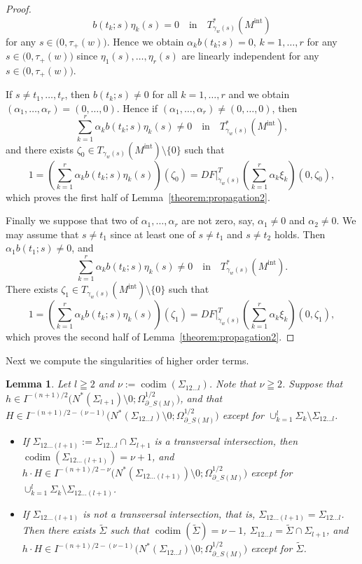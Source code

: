 \documentclass[a4paper,11pt,reqno]{amsart}
\numberwithin{equation}{section}
\newtheorem{lemma}[theorem]{Lemma}
\theoremstyle{definition}
\theoremstyle{remark}
\begin{document}
\begin{proof}
$$b(t_k;s)
\eta_k(s)
=
0
\quad
\text{in}
\quad
T^\ast_{\gamma_w(s)}(M^\text{int})
$$
%
%
for any $s \in \bigl(0,\tau_+(w)\bigr)$. 
Hence we obtain $\alpha_kb(t_k;s)=0$, $k=1,\dotsc,r$ 
for any $s\in\bigl(0,\tau_+(w)\bigr)$ 
since $\eta_1(s),\dotsc,\eta_r(s)$ are linearly independent 
for any $s\in\bigl(0,\tau_+(w)\bigr)$.  
%
%
\par
%
%
If $s \ne t_1,\dotsc,t_r$, then $b(t_k;s)\ne0$ for all $k=1,\dotsc,r$ and we obtain 
$(\alpha_1,\dotsc,\alpha_r)=(0,\dotsc,0)$. 
Hence if $(\alpha_1,\dotsc,\alpha_r)\ne(0,\dotsc,0)$, then 
%
%
$$
\sum_{k=1}^r
\alpha_k
b(t_k;s)
\eta_k(s)
\ne
0
\quad
\text{in}
\quad
T^\ast_{\gamma_w(s)}(M^\text{int}), 
$$
%
%
and there exists $\zeta_0 \in T_{\gamma_w(s)}(M^\text{int})\setminus\{0\}$ such that 
%
%
$$
1
=
\left(
\sum_{k=1}^r
\alpha_k
b(t_k;s)
\eta_k(s)
\right)(\zeta_0)
=
DF\vert^T_{\dot{\gamma}_w(s)}\left(\sum_{k=1}^r\alpha_k\xi_k\right)(0,\zeta_0),
$$
%
%
which proves the first half of Lemma~\ref{theorem:propagation2}. 
%
%
\par
%
%
Finally we suppose that two of $\alpha_1,\dotsc,\alpha_r$ are not zero, say, 
$\alpha_1\ne0$ and $\alpha_2\ne0$. 
We may assume that $s{\ne}t_1$ 
since at least one of $s{\ne}t_1$ and $s{\ne}t_2$ holds. 
Then $\alpha_1b(t_1;s)\ne0$, and 
%
%
$$
\sum_{k=1}^r
\alpha_k
b(t_k;s)
\eta_k(s)
\ne
0
\quad
\text{in}
\quad
T^\ast_{\gamma_w(s)}(M^\text{int}).
$$
%
%
There exists $\zeta_1 \in T_{\gamma_w(s)}(M^\text{int})\setminus\{0\}$ such that 
%
%
$$
1
=
\left(
\sum_{k=1}^r
\alpha_k
b(t_k;s)
\eta_k(s)
\right)(\zeta_1)
=
DF\vert^T_{\dot{\gamma}_w(s)}\left(\sum_{k=1}^r\alpha_k\xi_k\right)(0,\zeta_1),
$$
%
%
which proves the second half of Lemma~\ref{theorem:propagation2}. 
\end{proof}
%
%
Next we compute the singularities of higher order terms. 
%
%
\begin{lemma}
\label{theorem:higherorderterms} 
Let $l\geqq2$ and $\nu:=\operatorname{codim}(\Sigma_{12\dotsc{l}})$. 
Note that $\nu\geqq2$. Suppose that 
$h \in I^{-(n+1)/2}\bigl(N^\ast(\Sigma_{l+1})\setminus0;\Omega_{\partial_-S(M)}^{1/2}\bigr)$, 
and that 
$H \in I^{-(n+1)/2-(\nu-1)}\bigl(N^\ast(\Sigma_{12\dotsc{l}})\setminus0;\Omega_{\partial_-S(M)}^{1/2}\bigr)$ 
except for $\cup_{k=1}^l\Sigma_k\setminus\Sigma_{12\dotsc{l}}$. 
%
%
\begin{itemize}
\item
If  $\Sigma_{12\dotsc(l+1)}:=\Sigma_{12\dotsc{l}}\cap\Sigma_{l+1}$ is a transversal intersection, 
then $\operatorname{codim}(\Sigma_{12\dotsc(l+1)})=\nu+1$, and 
$h{\cdot}H \in  I^{-(n+1)/2-\nu}\bigl(N^\ast(\Sigma_{12\dotsc{(l+1)}})\setminus0;\Omega_{\partial_-S(M)}^{1/2}\bigr)$ 
except for $\cup_{k=1}^l\Sigma_k\setminus\Sigma_{12\dotsc{(l+1)}}$. 
\item
If  $\Sigma_{12\dotsc(l+1)}$ is not a transversal intersection, that is, 
$\Sigma_{12\dotsc(l+1)}=\Sigma_{12\dotsc{l}}$. 
Then there exists $\tilde{\Sigma}$ such that 
$\operatorname{codim}(\tilde{\Sigma})=\nu-1$, 
$\Sigma_{12\dotsc{l}}=\tilde{\Sigma}\cap\Sigma_{l+1}$, and 
$h{\cdot}H \in  I^{-(n+1)/2-(\nu-1)}\bigl(N^\ast(\Sigma_{12\dotsc{l}})\setminus0;\Omega_{\partial_-S(M)}^{1/2}\bigr)$ 
except for $\tilde{\Sigma}$. 
\end{itemize}
%
% 
\end{lemma}
\end{document}
